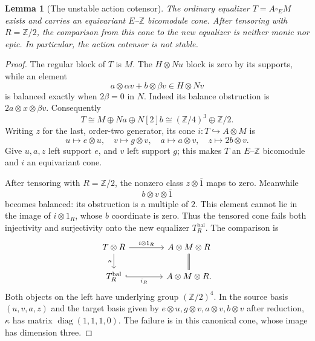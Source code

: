 \documentclass[11pt,a4paper]{article}
\newtheorem{lemma}[theorem]{Lemma}
\theoremstyle{definition}
\theoremstyle{remark}
\numberwithin{equation}{section}
\newcommand{\Z}{\mathbb Z}
\begin{document}
\begin{lemma}[The unstable action cotensor]\label{lem:unstable-cotensor}
The ordinary equalizer $T=A\square_E M$ exists and carries an
equivariant $E$--$\Z$ bicomodule cone. After tensoring with $R=\Z/2$,
the comparison from this cone to the new equalizer is neither monic
nor epic. In particular, the action cotensor is not stable.
\end{lemma}
\begin{proof}
The regular block of $T$ is
$M$. The $H\otimes Nu$ block is zero by its supports, while an element
\[
a\otimes\alpha v+b\otimes\beta v\in H\otimes Nv
\]
is balanced exactly when $2\beta=0$ in $N$. Indeed its balance
obstruction is $2a\otimes x\otimes\beta v$. Consequently
\begin{equation}\label{eq:badcotensor}
T\cong M\oplus Na\oplus N[2]b
\cong(\Z/4)^3\oplus\Z/2.
\end{equation}
Writing $z$ for the last, order-two generator, its cone
$i:T\hookrightarrow A\otimes M$ is
\begin{equation}\label{eq:badcone}
u\longmapsto e\otimes u,\quad
v\longmapsto g\otimes v,\quad
a\longmapsto a\otimes v,\quad
z\longmapsto2b\otimes v.
\end{equation}
Give $u,a,z$ left support $e$, and $v$ left support $g$; this makes
$T$ an $E$--$\Z$ bicomodule and $i$ an equivariant cone.

After tensoring with $R=\Z/2$, the nonzero class
$z\otimes\overline1$ maps to zero. Meanwhile
\begin{equation}\label{eq:newbalanced}
b\otimes v\otimes\overline1
\end{equation}
becomes balanced: its obstruction is a multiple of $2$. This element
cannot lie in the image of $i\otimes1_R$, whose $b$ coordinate is zero.
Thus the tensored cone fails both injectivity and surjectivity onto
the new equalizer $T_R^{\mathrm{bal}}$. The comparison is
\[
\begin{tikzcd}[column sep=4em]
T\otimes R \arrow[r,"i\otimes1_R"] \arrow[d,"\kappa"'] &
A\otimes M\otimes R \arrow[d,equal]\\
T_R^{\mathrm{bal}} \arrow[r,hook,"i_R"'] & A\otimes M\otimes R.
\end{tikzcd}
\]
Both objects on the left have underlying group $(\Z/2)^4$.
In the source basis $(u,v,a,z)$ and the target basis given by
$e\otimes u,g\otimes v,a\otimes v,b\otimes v$ after reduction,
$\kappa$ has matrix $\operatorname{diag}(1,1,1,0)$. The failure is in
this canonical cone, whose image has dimension three.
\end{proof}
\end{document}
